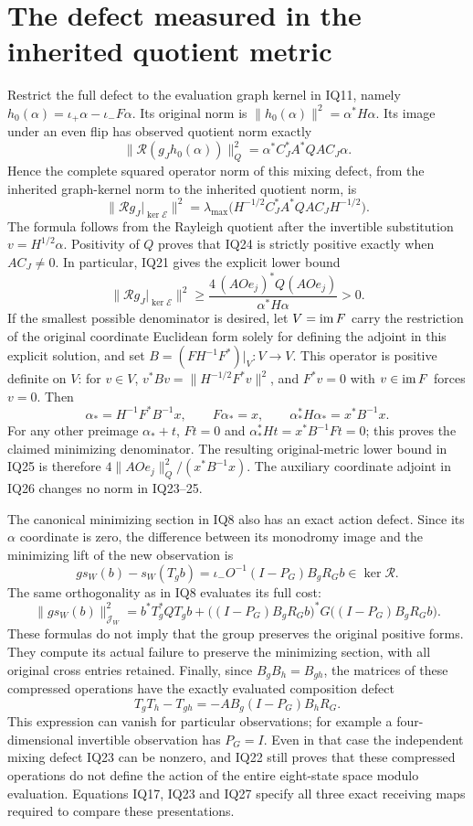 \documentclass[11pt]{article}
\begin{document}
\section{The defect measured in the inherited quotient metric}
Restrict the full defect to the evaluation graph kernel in IQ11, namely
$h_0(\alpha)=\iota_+\alpha-\iota_-F\alpha$.  Its original norm is
$\|h_0(\alpha)\|^2=\alpha^*H\alpha$.  Its image under an even flip
has observed quotient norm exactly
\[
 \|\mathcal R(g_Jh_0(\alpha))\|_Q^2
   =\alpha^*C_J^*A^*QA C_J\alpha.                  \tag{IQ23}
\]
Hence the complete squared operator norm of this mixing defect, from
the inherited graph-kernel norm to the inherited quotient norm, is
\[
 \|\mathcal Rg_J|_{\ker\mathcal E}\|^2
 =\lambda_{\max}
   \bigl(H^{-1/2}C_J^*A^*QA C_JH^{-1/2}\bigr).       \tag{IQ24}
\]
The formula follows from the Rayleigh quotient after the invertible
substitution $v=H^{1/2}\alpha$.  Positivity of $Q$ proves that IQ24
is strictly positive exactly when $AC_J\ne0$.  In particular, IQ21
gives the explicit lower bound
\[
 \|\mathcal Rg_J|_{\ker\mathcal E}\|^2
 \ge \frac{4\,(AOe_j)^*Q(AOe_j)}{\alpha^*H\alpha}>0. \tag{IQ25}
\]
If the smallest possible denominator is desired, let
$V=\operatorname{im} F$ carry the restriction of the original coordinate Euclidean
form solely for defining the adjoint in this explicit solution, and set
$B=(FH^{-1}F^*)|_V:V\to V$.  This operator is positive definite on
$V$: for $v\in V$, $v^*Bv=\|H^{-1/2}F^*v\|^2$, and
$F^*v=0$ with $v\in\operatorname{im} F$ forces $v=0$.  Then
\[
 \alpha_*=H^{-1}F^*B^{-1}x,\qquad
 F\alpha_*=x,\qquad
 \alpha_*^*H\alpha_*=x^*B^{-1}x.                   \tag{IQ26}
\]
For any other preimage $\alpha_*+t$, $Ft=0$ and
$\alpha_*^*Ht=x^*B^{-1}Ft=0$; this proves the claimed minimizing
denominator.  The resulting original-metric lower bound in IQ25 is
therefore $4\|AOe_j\|_Q^2/(x^*B^{-1}x)$.  The auxiliary coordinate
adjoint in IQ26 changes no norm in IQ23--25.

The canonical minimizing section in IQ8 also has an exact action defect.
Since its $\alpha$ coordinate is zero, the difference between its
monodromy image and the minimizing lift of the new observation is
\[
 g s_W(b)-s_W(T_gb)
 =\iota_-O^{-1}(I-P_G)B_gR_Gb\in\ker\mathcal R.     \tag{IQ27}
\]
The same orthogonality as in IQ8 evaluates its full cost:
\[
 \|g s_W(b)\|_{\mathcal J_W}^2
 =b^*T_g^*QT_gb+
  \bigl((I-P_G)B_gR_Gb\bigr)^*G
       \bigl((I-P_G)B_gR_Gb\bigr).                 \tag{IQ28}
\]
These formulas do not imply that the group preserves the original
positive forms.  They compute its actual failure to preserve the
minimizing section, with all original cross entries retained.
Finally, since $B_gB_h=B_{gh}$, the matrices of these compressed
operations have the exactly evaluated composition defect
\[
 T_gT_h-T_{gh}
   =-AB_g(I-P_G)B_hR_G.                            \tag{IQ29}
\]
This expression can vanish for particular observations; for example a
four-dimensional invertible observation has $P_G=I$.  Even in that
case the independent mixing defect IQ23 can be nonzero, and IQ22
still proves that these compressed operations do not define the
action of the entire eight-state space modulo evaluation.  Equations
IQ17, IQ23 and IQ27 specify all three exact receiving maps required
to compare these presentations.
\end{document}
